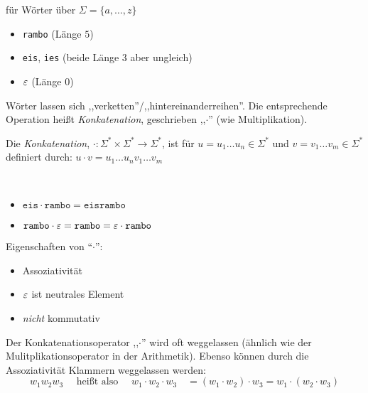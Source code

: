\goodbreak

\begin{Bsp*} für Wörter über $\Sigma=\{a,\dots,z\}$
  \begin{itemize}
  \item \verb/rambo/ (Länge $5$)
  \item \verb/eis/, \verb/ies/ (beide Länge 3 aber ungleich) 
  \item $\varepsilon$ (Länge $0$)
  \end{itemize}
\end{Bsp*}
Wörter lassen sich ,,verketten''/,,hintereinanderreihen''.
Die entsprechende Operation heißt \emph{Konkatenation}, geschrieben ,,$\cdot$'' (wie Multiplikation).
\begin{Def}
  Die \emph{Konkatenation}, $\mathord{\cdot} : \Sigma^* \times \Sigma^* \to \Sigma^*$, ist für $u=u_1\ldots u_n\in\Sigma^*$ und $v=v_1\ldots v_m\in\Sigma^*$ definiert durch:
  $u\cdot v = u_1\ldots u_nv_1\ldots v_m$
\end{Def}
\begin{Bsp*} ~
  \begin{itemize}
  \item $\mathtt{eis}\cdot\mathtt{rambo} =\mathtt{eisrambo}$
  \item $\mathtt{rambo} \cdot \varepsilon = \mathtt{rambo} = \varepsilon \cdot \mathtt{rambo}$ 
  \end{itemize}
\end{Bsp*}
Eigenschaften von "`$\cdot$"':
\begin{itemize}
\item Assoziativität
\item $\varepsilon$ ist neutrales Element
\item \emph{nicht} kommutativ
\end{itemize}


Der Konkatenationsoperator ,,$\cdot$'' wird oft weggelassen (ähnlich wie der Mulitplikationsoperator in der Arithmetik).
Ebenso können durch die Assoziativität Klammern weggelassen werden:
\begin{displaymath}
  w_1w_2w_3 \quad \text{ heißt also } \quad w_1\cdot w_2\cdot w_3 \quad = (w_1 \cdot w_2) \cdot w_3 = w_1 \cdot (w_2 \cdot w_3)
\end{displaymath}

